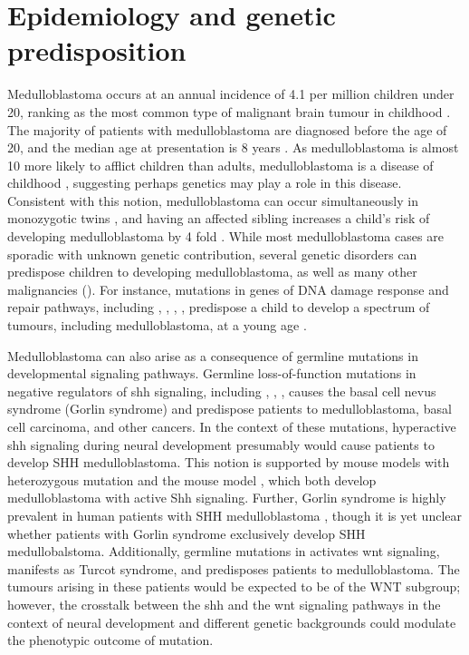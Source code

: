 \section{Epidemiology and genetic predisposition}

Medulloblastoma occurs at an annual incidence of 4.1 per million children under 20, ranking as the most common type of malignant brain tumour in childhood . The majority of patients with medulloblastoma are diagnosed before the age of 20, and the median age at presentation is 8 years . As medulloblastoma is almost 10 more likely to afflict children than adults, medulloblastoma is a disease of childhood , suggesting perhaps genetics may play a role in this disease. Consistent with this notion, medulloblastoma can occur simultaneously in monozygotic twins , and having an affected sibling increases a child's risk of developing medulloblastoma by 4 fold . While most medulloblastoma cases are sporadic with unknown genetic contribution, several genetic disorders can predispose children to developing medulloblastoma, as well as many other malignancies (). For instance, mutations in genes of DNA damage response and repair pathways, including , , , , predispose a child to develop a spectrum of tumours, including medulloblastoma, at a young age .

Medulloblastoma can also arise as a consequence of germline mutations in developmental signaling pathways. Germline loss-of-function mutations in negative regulators of \gls{shh} signaling, including , , , causes the basal cell nevus syndrome (Gorlin syndrome) and predispose patients to medulloblastoma, basal cell carcinoma, and other cancers. In the context of these mutations, hyperactive \gls{shh} signaling during neural development presumably would cause patients to develop SHH medulloblastoma. This notion is supported by mouse models with heterozygous  mutation  and the \high{+/-} \high{-/-} mouse model , which both develop medulloblastoma with active Shh signaling. Further, Gorlin syndrome is highly prevalent in human patients with SHH medulloblastoma , though it is yet unclear whether patients with Gorlin syndrome exclusively develop SHH medullobalstoma. Additionally, germline mutations in  activates \gls{wnt} signaling, manifests as Turcot syndrome, and predisposes patients to medulloblastoma. The tumours arising in these patients would be expected to be of the WNT subgroup; however, the crosstalk between the \gls{shh} and the \gls{wnt} signaling pathways in the context of neural development and different genetic backgrounds could modulate the phenotypic outcome of  mutation.

